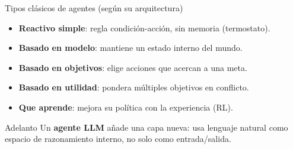 \begin{frame}{Tipos clásicos de agentes (según su arquitectura)}
  \small
  \begin{itemize}
    \item \textbf{Reactivo simple}: regla condición-acción, sin memoria (termostato).
    \item \textbf{Basado en modelo}: mantiene un estado interno del mundo.
    \item \textbf{Basado en objetivos}: elige acciones que acercan a una meta.
    \item \textbf{Basado en utilidad}: pondera múltiples objetivos en conflicto.
    \item \textbf{Que aprende}: mejora su política con la experiencia (RL).
  \end{itemize}
  \vfill
  \begin{alertblock}{Adelanto}
    Un \textbf{agente LLM} añade una capa nueva: usa lenguaje natural como
    espacio de razonamiento interno, no solo como entrada/salida.
  \end{alertblock}
\end{frame}
